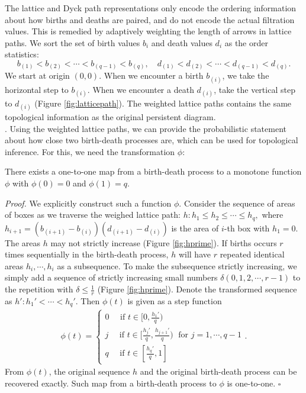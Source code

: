 \documentclass{llncs}
\newcommand{\bq}{\begin{eqnarray*}}
\newcommand{\eq}{\end{eqnarray*}}
\begin{document}
The lattice and Dyck path representations only encode the ordering information about how births and deaths are paired, and do not encode the actual filtration values. This is remedied by adaptively weighting the length of arrows in lattice paths. We sort the set of birth values $b_i$ and death values $d_i$ as the order statistics:
$$b_{(1)} < b_{(2)} < \cdots < b_{(q-1)} < b_{(q)}, \quad d_{(1)} < d_{(2)} < \cdots < d_{(q-1)} < d_{(q)}.$$
We start at origin $(0,0)$. When we encounter a birth $b_{(i)}$, we take the horizontal step to $b_{(i)}$. When we encounter a death $d_{(i)}$, take the vertical step to $d_{(i)}$ (Figure \ref{fig:latticepath}). 
 The weighted lattice paths contains the same topological information as the original persistent diagram. \\
 
 
. 
 Using the weighted lattice paths, we can provide the probabilistic statement about how close two  birth-death processes are, which can be used for topological inference. For this, we need the transformation $\phi$:
 
\begin{theorem}\label{thm::phi} 
There exists a one-to-one map from a birth-death process to a monotone function $\phi$  with $\phi(0)=0$ and $\phi(1) =q$. 
\end{theorem}
{\em Proof.} We explicitly construct such a function $\phi$. Consider the sequence of areas of boxes  as we traverse the weighed lattice path: $ h: h_1 \leq h_2 \leq  \cdots \leq h_{q},$
where $h_{i+1} = (b_{(i+1)} - b_{(i)})(d_{(i+1)} - d_{(i)})$ is the area of $i$-th box with $h_1 =0$. The areas $h$ may not strictly increase (Figure \ref{fig:hprime}). If births occurs $r$ times sequentially in the birth-death process,  $h$ will have $r$ repeated identical areas $h_i, \cdots, h_i$ as a subsequence. To make the subsequence  strictly increasing, we simply add a sequence of strictly increasing small numbers $\delta (0, 1, 2, \cdots, r-1)$ to the repetition with  $\delta \leq \frac{1}{r}$ (Figure \ref{fig:hprime}). Denote the transformed sequence as $h': h_1' < \cdots < h_q'$. Then $\phi(t)$ is given as a step function
\bq 
\phi(t) = 
\begin{cases}
0 \quad \mbox{ if }  t \in [0,  \frac{h_1'}{q})\\
j  \quad \mbox { if } t \in [\frac{h_{j}'}{q}, \frac{h_{j+1}'}{q})  \; \mbox{ for } j= 1, \cdots, q-1\\
q \quad \mbox{ if } t \in [\frac{h_q'}{q},1] 
\end{cases}. \label{eq:step} 
\eq
From $\phi(t)$, the original sequence $h$ and  the original birth-death process can be recovered exactly. Such map from a birth-death process to $\phi$ is one-to-one. \hfill   $\square$
\end{document}
